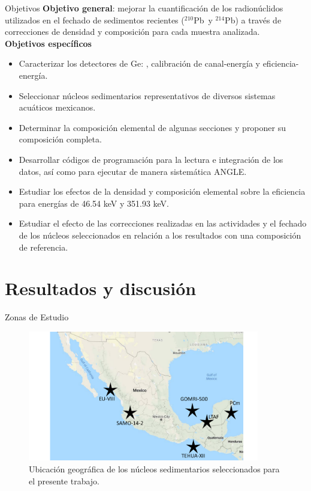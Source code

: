 \documentclass[9pt]{beamer}
\newcommand{\PbCero}{$^{210}$Pb}
\newcommand{\PbCuatro}{$^{214}$Pb}
\begin{document}
\begin{frame}{Objetivos}
\justifying \textbf{Objetivo general}: mejorar la cuantificación de los radionúclidos utilizados en el fechado de sedimentos recientes (\PbCero\, y \PbCuatro) a través de correcciones de densidad y composición para cada muestra analizada. \pause 
\\ 
\vspace{0.5cm}
\textbf{Objetivos específicos} 
\begin{itemize}
\justifying
\item Caracterizar los detectores de Ge: \hyperlink{Espectros}{}, calibración de canal-energía y eficiencia-energía.
\item Seleccionar núcleos sedimentarios representativos de diversos sistemas acuáticos mexicanos.
\item Determinar la composición elemental de algunas secciones y proponer su composición completa.
\item Desarrollar códigos de programación para la lectura e integración de los datos, así como para ejecutar de manera sistemática ANGLE.
\item Estudiar los efectos de la densidad y composición elemental sobre la eficiencia para energías de 46.54 keV y 351.93 keV.
\item Estudiar el efecto de las correcciones realizadas en las actividades y el fechado de los núcleos seleccionados en relación a los resultados con una composición de referencia. 
\end{itemize}
\end{frame}

\section{Resultados y discusión}

\begin{frame}{Zonas de Estudio}
	\begin{figure}
	\centering
	\includegraphics[width=0.9\textwidth]{Imagenes/Mapa_Nucleos_Seleccionados.pdf}
	\caption{Ubicación geográfica de los núcleos sedimentarios seleccionados para el presente trabajo.}
	\end{figure}
\end{frame}
\end{document}
